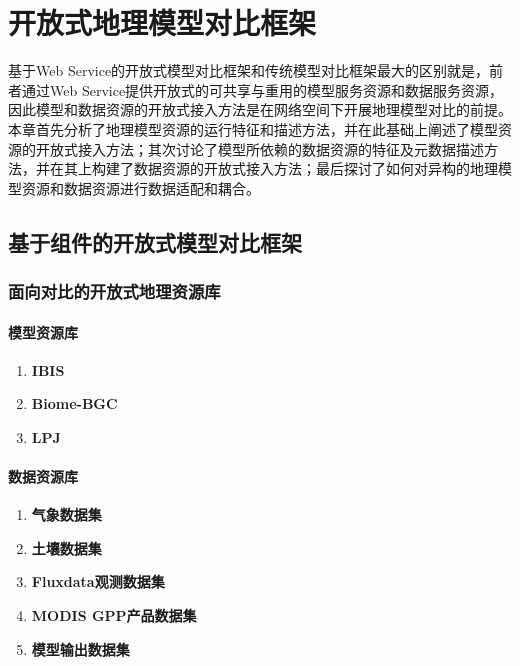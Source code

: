 \chapter{开放式地理模型对比框架}
基于Web Service的开放式模型对比框架和传统模型对比框架最大的区别就是，前者通过Web Service提供开放式的可共享与重用的模型服务资源和数据服务资源，因此模型和数据资源的开放式接入方法是在网络空间下开展地理模型对比的前提。本章首先分析了地理模型资源的运行特征和描述方法，并在此基础上阐述了模型资源的开放式接入方法；其次讨论了模型所依赖的数据资源的特征及元数据描述方法，并在其上构建了数据资源的开放式接入方法；最后探讨了如何对异构的地理模型资源和数据资源进行数据适配和耦合。

\section{基于组件的开放式模型对比框架}
\subsection{面向对比的开放式地理资源库}
\subsubsection{模型资源库}
\begin{enumerate}[(1)]
\item \textbf{IBIS}

\item \textbf{Biome-BGC}

\item \textbf{LPJ}

\end{enumerate}


\subsubsection{数据资源库}
\begin{enumerate}[(1)]
\item \textbf{气象数据集}

\item \textbf{土壤数据集}

\item \textbf{Fluxdata观测数据集}

\item \textbf{MODIS GPP产品数据集}

\item \textbf{模型输出数据集}

\end{enumerate}
